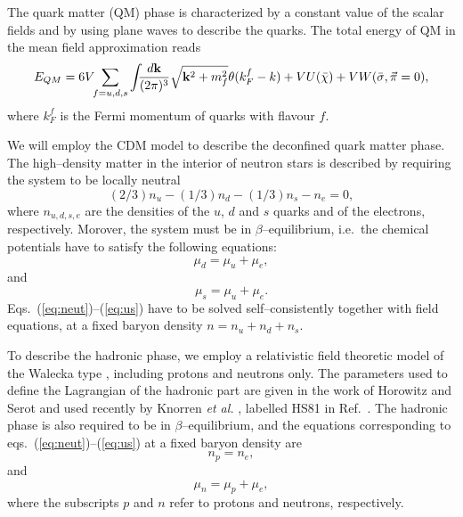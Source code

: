 The quark matter (QM) phase is characterized by a constant value of the 
scalar fields and by using plane waves to describe the quarks.
The total energy of QM in the mean field approximation reads
\begin{equation}
      E_{QM}=6 V \!\!\sum_{f=u,d,s}\int\!\!\!
      {d{\bf k} \over (2\pi)^3}
      \sqrt{{\bf k}^2 + m_f^2}
      \theta (k_F^f-k)
      + V U(\bar \chi) + V W(\bar \sigma,\vec\pi=0),
      \label{eq:in4}
\end{equation}
where $k_{F}^f$ is the Fermi momentum of quarks with flavour $f$.

We will employ the CDM model to describe the deconfined quark
matter phase.
The high--density matter 
in the interior of neutron stars is described by
requiring the system to be locally neutral
\begin{equation} 
    \label{eq:neut}
    (2/3)n_u -(1/3)n_d - (1/3)n_s - n_e = 0,
\end{equation}
where $n_{u,d,s,e}$ 
are the densities of the $u$, $d$ and $s$ quarks and of the
electrons, respectively. 
Morover, the system must be in $\beta$--equilibrium, i.e.\
the chemical potentials have to satisfy the following equations:
\begin{equation}
      \label{eq:ud}
      \mu_d=\mu_u+\mu_e,
\end{equation}
and
\begin{equation}
      \label{eq:us}
      \mu_s=\mu_u+\mu_e .
\end{equation}
Eqs.\ (\ref{eq:neut})--(\ref{eq:us}) have to be solved 
self--consistently together with
field equations, at a fixed baryon density $n=n_u+n_d+n_s$.

To describe the hadronic phase, we employ a relativistic field
theoretic model of the Walecka type \cite{sw86}, 
including protons and neutrons
only. The parameters used to define the Lagrangian of the hadronic part
are given in the work of Horowitz and Serot \cite{hs81} and
used recently by Knorren {\em et al.} \cite{kpe95}, labelled HS81
in Ref.\ \cite{kpe95}.
The hadronic phase is also required to be in $\beta$--equilibrium,
and the equations corresponding to eqs.\
(\ref{eq:neut})--(\ref{eq:us}) at a fixed baryon density are 
\begin{equation} 
    \label{eq:neut_np}
    n_p= n_e,
\end{equation}
and 
\begin{equation}
      \label{eq:np_chem}
      \mu_n=\mu_p+\mu_e,
\end{equation}
where the subscripts $p$  and $n$ 
refer to protons and neutrons, respectively.

